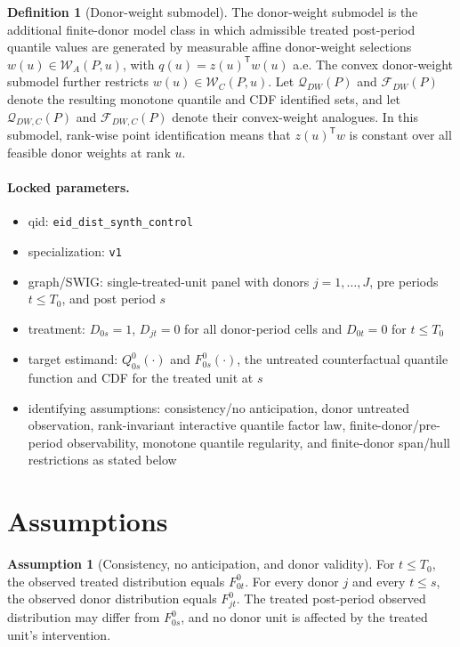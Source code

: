 \documentclass[11pt]{article}
\newcommand{\transpose}{\mathsf{T}}
\theoremstyle{definition}
\newtheorem{definition}{Definition}
\newtheorem{assumption}{Assumption}
\theoremstyle{plain}
\theoremstyle{remark}
\begin{document}
\begin{definition}[Donor-weight submodel]\label{def:donorweight}
The donor-weight submodel is the additional finite-donor model class in which admissible treated post-period quantile values are generated by measurable affine donor-weight selections \(w(u)\in\mathcal{W}_A(P,u)\), with \(q(u)=z(u)^\transpose w(u)\) a.e.  The convex donor-weight submodel further restricts \(w(u)\in\mathcal{W}_C(P,u)\).  Let \(\mathcal{Q}_{DW}(P)\) and \(\mathcal{F}_{DW}(P)\) denote the resulting monotone quantile and CDF identified sets, and let \(\mathcal{Q}_{DW,C}(P)\) and \(\mathcal{F}_{DW,C}(P)\) denote their convex-weight analogues.  In this submodel, rank-wise point identification means that \(z(u)^\transpose w\) is constant over all feasible donor weights at rank \(u\).
\end{definition}

\paragraph{Locked parameters.}
\begin{itemize}[leftmargin=*]
\item qid: \texttt{eid\_dist\_synth\_control}
\item specialization: \texttt{v1}
\item graph/SWIG: single-treated-unit panel with donors \(j=1,\ldots,J\), pre periods \(t\le T_0\), and post period \(s\)
\item treatment: \(D_{0s}=1\), \(D_{jt}=0\) for all donor-period cells and \(D_{0t}=0\) for \(t\le T_0\)
\item target estimand: \(Q^0_{0s}(\cdot)\) and \(F^0_{0s}(\cdot)\), the untreated counterfactual quantile function and CDF for the treated unit at \(s\)
\item identifying assumptions: consistency/no anticipation, donor untreated observation, rank-invariant interactive quantile factor law, finite-donor/pre-period observability, monotone quantile regularity, and finite-donor span/hull restrictions as stated below
\end{itemize}

\section{Assumptions}
\begin{assumption}[Consistency, no anticipation, and donor validity]\label{ass:consistency}
For \(t\le T_0\), the observed treated distribution equals \(F^0_{0t}\).  For every donor \(j\) and every \(t\le s\), the observed donor distribution equals \(F^0_{jt}\).  The treated post-period observed distribution may differ from \(F^0_{0s}\), and no donor unit is affected by the treated unit's intervention.
\end{assumption}
\end{document}
